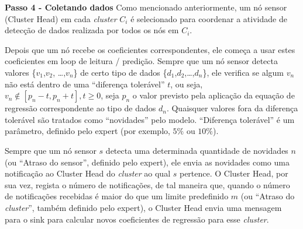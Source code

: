 \documentclass{acm_proc_article-sp}
\begin{document}
{\bf Passo 4 - Coletando dados}
Como mencionado anteriormente, um nó sensor (Cluster Head) em cada {\it cluster}
$C_{i}$ é selecionado para coordenar a atividade de detecção de
dados realizada por todos os nós em $C_ {i}$.
\vspace*{-.3cm}

Depois que um nó recebe os coeficientes correspondentes, ele começa a usar 
estes coeficientes em loop de leitura / predição. 
Sempre que um nó sensor detecta valores \{$v_{1}$,$v_{2}$, \ldots,$v_{n}$\} de 
certo tipo de dados \{$d_{1}$,$d_{2}$,\ldots,$d_{n}$\}, ele verifica se 
algum $v_{n}$ não está dentro de uma ``diferença tolerável'' $t$, ou seja,
$v_{n} \not \in [p_{n}-t,p_{n}+t], t \geq 0$, seja $p_{n}$ 
o valor previsto pela aplicação da equação de regressão correspondente
ao tipo de dados $d_{n}$. Quaisquer valores fora da diferença tolerável são 
tratados como ``novidades'' pelo modelo. ``Diferença tolerável'' é um
parâmetro, definido pelo expert (por exemplo, $5\%$ ou $10\%$).
\vspace*{-.3cm}

Sempre que um nó sensor $s$ detecta uma determinada quantidade de
novidades $n$ (ou ``Atraso do sensor'', definido pelo expert),
ele envia as novidades como uma notificação ao Cluster Head do {\it cluster}
ao qual $s$ pertence. O Cluster Head, por sua vez, regista o número de 
notificações, de tal maneira que, quando o número de notificações recebidas
é maior do que um limite predefinido $m$ (ou ``Atraso do {\it cluster}'',
também definido pelo expert), o Cluster Head envia uma mensagem para o sink
para calcular novos coeficientes de regressão para esse {\it cluster}.
\vspace*{-.3cm}
\end{document}
